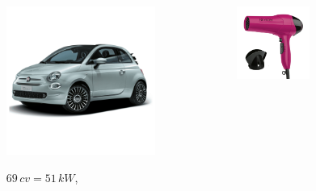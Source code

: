 \documentclass[handout]{beamer}
\theoremstyle{plain}
\begin{document}
\begin{frame}
\begin{columns}
\begin{column}{0.25\textwidth}
\begin{figure}
    $ 700 \, W $
  \end{figure}    
  \end{column}
    \begin{column}{0.25\textwidth}
  \begin{figure}
    \includegraphics[width=\columnwidth]{img/500.png}

    $ 69 \, cv  = 51 \, kW $, 
  \end{figure}    
  \end{column}
  \begin{column}{0.25\textwidth}
  \begin{figure}
    \includegraphics[width=\columnwidth]{img/phon.png}


\end{figure}
\end{column}
\end{columns}
\end{frame}
\end{document}
